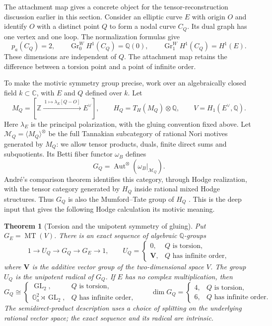 \documentclass[11pt]{article}
\newtheorem{theorem}{Theorem}[section]
\theoremstyle{definition}
\theoremstyle{remark}
\newcommand{\Q}{\mathbb Q}
\newcommand{\Z}{\mathbb Z}
\newcommand{\C}{\mathbb C}
\begin{document}
The attachment map gives a concrete object for the tensor-reconstruction
discussion earlier in this section. Consider an elliptic curve $E$
with origin $O$ and identify $O$ with a distinct point $Q$ to form a
nodal curve $C_Q$. Its dual graph has one vertex and one loop.
The normalization formulas give
\[
 p_a(C_Q)=2,\qquad
 \operatorname{Gr}^W_0H^1(C_Q)=\Q(0),\qquad
 \operatorname{Gr}^W_1H^1(C_Q)=H^1(E).
\]
These dimensions are independent of $Q$. The attachment map retains the
difference between a torsion point and a point of infinite order.

To make the motivic symmetry group precise, work over an algebraically
closed field $k\subset\C$, with $E$ and $Q$ defined over $k$. Let
\[
 M_Q=[\Z\xrightarrow{\ 1\mapsto\lambda_E[Q-O]\ }E^\vee],
 \qquad H_Q=T_H(M_Q)\otimes\Q,\qquad V=H_1(E^\vee,\Q).
\]
Here $\lambda_E$ is the principal polarization, with the gluing convention
fixed above. Let $\mathcal M_Q=\langle M_Q\rangle^\otimes$ be the full
Tannakian subcategory of rational Nori motives generated by $M_Q$:
we allow tensor products, duals, finite direct sums and subquotients.
Its Betti fiber functor $\omega_B$ defines
\[
 G_Q=\operatorname{Aut}^\otimes(\omega_B|_{\mathcal M_Q}).
\]
Andr\'e's comparison theorem identifies this category, through Hodge
realization, with the tensor category generated by $H_Q$ inside rational
mixed Hodge structures. Thus $G_Q$ is also the Mumford--Tate group of
$H_Q$ \cite[Theorem 1.2.1]{galoisAndreOneMotives}. This is the deep input
that gives the following Hodge calculation its motivic meaning.

\begin{theorem}[Torsion and the unipotent symmetry of gluing]
\label{thm:galois-attachment}
Put $G_E=\operatorname{MT}(V)$. There is an exact sequence of algebraic
$\Q$-groups
\[
 1\longrightarrow U_Q\longrightarrow G_Q\longrightarrow G_E
 \longrightarrow1,
 \qquad
 U_Q=
 \begin{cases}
  0,&Q\text{ is torsion},\\
  \mathbf V,&Q\text{ has infinite order},
 \end{cases}
\]
where $\mathbf V$ is the additive vector group of the two-dimensional
space $V$. The group $U_Q$ is the unipotent radical of $G_Q$.
If $E$ has no complex multiplication, then
\[
 G_Q\cong
 \begin{cases}
  \operatorname{GL}_2,&Q\text{ is torsion},\\
  \mathbb G_a^2\rtimes\operatorname{GL}_2,&Q\text{ has infinite order},
 \end{cases}
 \qquad
 \dim G_Q=
 \begin{cases}4,&Q\text{ is torsion},\\6,&Q\text{ has infinite order}.\end{cases}
\]
The semidirect-product description uses a choice of splitting on the
underlying rational vector space; the exact sequence and its radical
are intrinsic.
\end{theorem}
\end{document}
